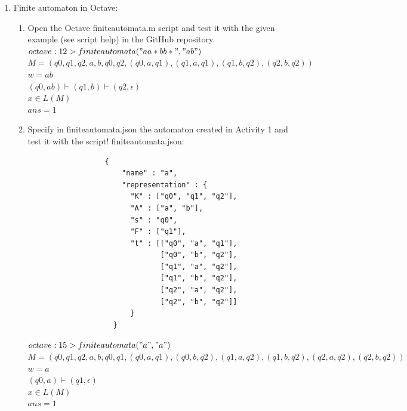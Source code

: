 \documentclass{article}
\begin{document}
\begin{enumerate}
    \item Finite automaton in Octave:
          \begin{enumerate}
              \item Open the Octave finiteautomata.m script and test it with the given example (see script help) in the GitHub repository.\\
                        $octave:12> finiteautomata("aa*bb*", "ab")$\\
                        $M = ({q0, q1, q2}, {a, b}, q0, {q2}, {(q0, a, q1), (q1, a, q1), (q1, b, q2), (q2, b, q2)})$\\
                        $w = ab$\\
                        $(q0, ab) \vdash (q1, b) \vdash (q2, \epsilon)$\\
                        $x \in L(M)$\\
                        $ans = 1$\\
              \item Specify in finiteautomata.json the automaton created in Activity 1 and test it with the script!
                    finiteautomata.json:
                    \begin{verbatim}
                  {
                      "name" : "a",
                      "representation" : {
                        "K" : ["q0", "q1", "q2"],
                        "A" : ["a", "b"],
                        "s" : "q0",
                        "F" : ["q1"],
                        "t" : [["q0", "a", "q1"],
                               ["q0", "b", "q2"],
                               ["q1", "a", "q2"],
                               ["q1", "b", "q2"],
                               ["q2", "a", "q2"],
                               ["q2", "b", "q2"]]
                        }
                    }
              \end{verbatim}
                $octave:15> finiteautomata("a","a")$\\
                $M = ({q0, q1, q2}, {a, b}, q0, {q1}, {(q0, a, q1), (q0, b, q2), (q1, a, q2), (q1, b, q2), (q2, a, q2), (q2, b, q2)})$\\
                $w = a$\\
                $(q0, a) \vdash (q1, \epsilon)$\\
                $x \in L(M)$\\
                $ans = 1$
          \end{enumerate}

\end{enumerate}
\pagebreak
\end{document}
